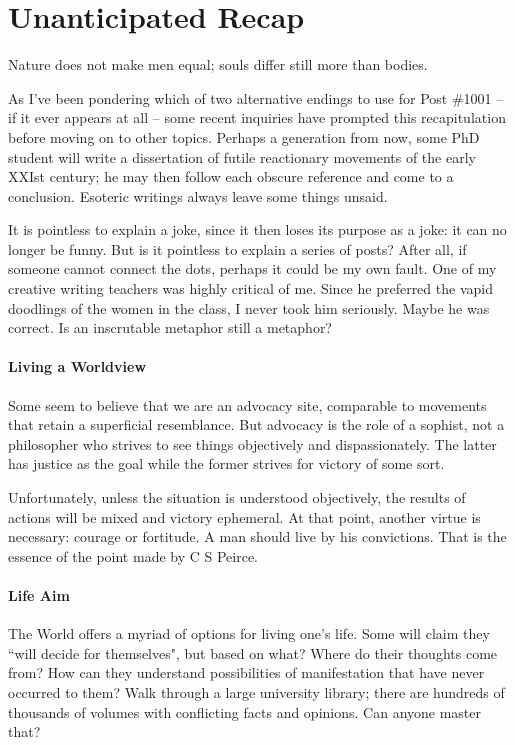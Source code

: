 \section{Unanticipated Recap}

\begin{quotex}
Nature does not make men equal; souls differ still more than bodies. 

\end{quotex}
As I've been pondering which of two alternative endings to use for Post \#1001 – if it ever appears at all – some recent inquiries have prompted this recapitulation before moving on to other topics. Perhaps a generation from now, some PhD student will write a dissertation of futile reactionary movements of the early XXIst century; he may then follow each obscure reference and come to a conclusion. Esoteric writings always leave some things unsaid.

It is pointless to explain a joke, since it then loses its purpose as a joke: it can no longer be funny. But is it pointless to explain a series of posts? After all, if someone cannot connect the dots, perhaps it could be my own fault. One of my creative writing teachers was highly critical of me. Since he preferred the vapid doodlings of the women in the class, I never took him seriously. Maybe he was correct. Is an inscrutable metaphor still a metaphor?

\paragraph{Living a Worldview}
Some seem to believe that we are an advocacy site, comparable to movements that retain a superficial resemblance. But advocacy is the role of a sophist, not a philosopher who strives to see things objectively and dispassionately. The latter has justice as the goal while the former strives for victory of some sort.

Unfortunately, unless the situation is understood objectively, the results of actions will be mixed and victory ephemeral. At that point, another virtue is necessary: courage or fortitude. A man should live by his convictions. That is the essence of the point made by C S Peirce.

\paragraph{Life Aim}
The World offers a myriad of options for living one's life. Some will claim they ``will decide for themselves", but based on what? Where do their thoughts come from? How can they understand possibilities of manifestation that have never occurred to them? Walk through a large university library; there are hundreds of thousands of volumes with conflicting facts and opinions. Can anyone master that?

